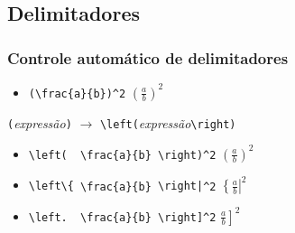 \documentclass[handout,10pt]{beamer}
\begin{document}
\subsection{Delimitadores}
\begin{frame}[fragile]
	\frametitle{Controle automático de delimitadores}
		
	\begin{atividade}{4}
		\begin{itemize}
			\item<1-> \verb|(\frac{a}{b})^2| \hfill \(\displaystyle(\frac{a}{b})^2\)
		\end{itemize}
		
		
		\begin{center}
			{\color{blue}\verb|(|}\textit{expressão}{\color{red}\verb|)|} \pause\quad\(\to\)\quad
			{\color{blue}\verb|\left(|}\textit{expressão}{\color{red}\verb|\right)|}
		\end{center}
		
			
		\begin{itemize}
			\item<4-> {\color{blue}\verb|\left(|}\verb|  \frac{a}{b} |{\color{red}\verb|\right)|}\verb|^2|%
								\hfill \(\displaystyle\left(\frac{a}{b}\right)^2\)
			\item<5-> {\color{blue}\verb|\left\{|}\verb| \frac{a}{b} |{\color{red}\verb!\right|!}\verb|^2|%
								\hfill \(\displaystyle\left\{\frac{a}{b}\right|^2\)
			\item<6-> {\color{blue}\verb|\left.|}\verb|  \frac{a}{b} |{\color{red}\verb|\right]|}\verb|^2|%
								\hfill \(\displaystyle\left.\frac{a}{b}\right]^2\)
		\end{itemize}
		
	\end{atividade}
	
	
\end{frame}
\end{document}
